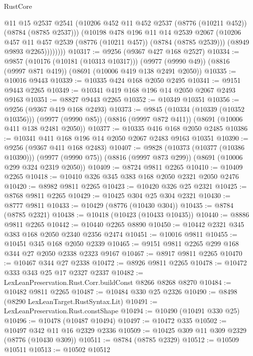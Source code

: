 \begin{lexlean}{RustCore}
\begin{coremodule}
                @11
                @15
                @2537
                @2541
                (@10206 @452 @11 @452 @2537 (@8776 (@10211 @452)) (@8784 (@8785 @2537)))
                (@10198
                  @478
                  @196
                  @11
                  @14
                  @2539
                  @2067
                  (@10206 @457 @11 @457 @2539 (@8776 (@10211 @457)) (@8784 (@8785 @2539)))
                  (@8949 @9893 @2265))))))))
@10317 := @9256 (@9367 @427 @168 @2527)
@10334 := @9857
    (@10176 (@10181 (@10313 @10317)))
    (@9977 (@9990 @49))
    (@8816 (@9997 @871 @419))
    (@8691 (@10006 @419 @138 @2491 @2050))
@10335 := @10016 @9443
@10339 := @10335 @424 @168 @2050 @2495
@10341 := @9151 @9443 @2265
@10349 := @10341 @419 @168 @196 @14 @2050 @2067 @2493 @9163
@10351 := @8827 @9443 @2265
@10352 := @10349 @10351
@10356 := @9256 (@9367 @419 @168 @2493)
@10373 := @9845
    (@10334 (@10339 (@10352 @10356)))
    (@9977 (@9990 @85))
    (@8816 (@9997 @872 @411))
    (@8691 (@10006 @411 @138 @2481 @2050))
@10377 := @10335 @416 @168 @2050 @2485
@10386 := @10341 @411 @168 @196 @14 @2050 @2067 @2483 @9163 @10351
@10390 := @9256 (@9367 @411 @168 @2483)
@10407 := @9828
    (@10373 (@10377 (@10386 @10390)))
    (@9977 (@9990 @75))
    (@8816 (@9997 @873 @299))
    (@8691 (@10006 @299 @324 @2319 @2050))
@10409 := @8724 @9811 @2265
@10410 := @10409 @2265
@10418 := @10410 @326 @345 @383 @168 @2050 @2321 @2050 @2476
@10420 := @8982 @9811 @2265
@10423 := @10420 @326 @25 @2321
@10425 := @8768 @9811 @2265
@10429 := @10425 @304 @25 @304 @2321
@10430 := @8777 @9811
@10433 := @10429 (@8776 (@10430 @304))
@10435 := @8784 (@8785 @2321)
@10438 := @10418 (@10423 (@10433 @10435))
@10440 := @8886 @9811 @2265
@10442 := @10440 @2265 @8890
@10450 := @10442 @2321 @345 @383 @168 @2050 @2340 @2356 @2474
@10451 := @10016 @9811
@10455 := @10451 @345 @168 @2050 @2339
@10465 := @9151 @9811 @2265 @299 @168 @344 @27 @2050 @2338 @2323 @9167
@10467 := @8917 @9811 @2265
@10470 := @10467 @344 @27 @2338
@10472 := @8926 @9811 @2265
@10478 := @10472 @333 @343 @25 @17 @2327 @2337
@10482 := LexLeanPreservation.Rust.Corr.buildConst @8266 @8268 @8270
@10484 := @10482 @9811 @2265
@10487 := @10484 @330 @25 @2326
@10490 := @8498 (@8290 LexLeanTarget.RustSyntax.Lit)
@10491 := LexLeanPreservation.Rust.constShape
@10494 := @10490 (@10491 @330 @25)
@10496 := @10478 (@10487 @10494)
@10497 := @10472 @335
@10502 := @10497 @342 @11 @16 @2329 @2336
@10509 := @10425 @309 @11 @309 @2329 (@8776 (@10430 @309))
@10511 := @8784 (@8785 @2329)
@10512 := @10509 @10511
@10513 := @10502 @10512

\end{coremodule}
\end{lexlean}
